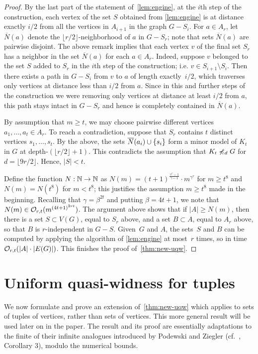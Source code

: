 \begin{proof}
By the last part of the statement of~\cref{lem:engine},  at the $i$th step of the construction, each vertex of the set $S$ obtained from \cref{lem:engine}
is at distance exactly $i/2$ from all the vertices in $A_{i+1}$ in the graph 
$G-S_i$. 
For $a\in A_r$, let $\overline{N}(a)$ denote the $\lfloor r/2\rfloor$-neighborhood of $a$ in $G-S_r$; note that sets $\overline{N}(a)$ are pairwise disjoint.
The above remark implies that each vertex $v$ of the final set $S_r$ has a neighbor in the set $\overline{N}(a)$ for each $a\in A_r$.
Indeed, suppose $v$ belonged to the set $S$ added to $S_r$ in the $i$th step of the construction; i.e. $v\in S_{i+1}\setminus S_i$.
Then there exists a path in $G-S_i$ from $v$ to $a$ of length exactly~$i/2$, which traverses only vertices at distance less than $i/2$ from $a$.
Since in this and further steps of the construction we were removing only vertices at distance at least $i/2$ from $a$, this path stays intact in $G-S_r$ and hence is completely contained in $\overline{N}(a)$.

By assumption that $m\ge t$, we may choose pairwise different vertices $a_1,\ldots,a_t\in A_r$.
To reach a contradiction, suppose that $S_r$ contains $t$ distinct vertices $s_1,\ldots,s_t$. 
By the above, the sets $\overline{N}(a_i)\cup\{s_i\}$ 
form a minor model of $K_t$ in $G$ at depth-$(\lfloor r/2\rfloor+1)$.
This contradicts the assumption that $K_t\not\preccurlyeq_d G$ for $d=\lfloor 9r/2 \rfloor$.
Hence, $|S|<t$.

Define the function  $N:\mathbb{N}\to\mathbb{N}$
as $N(m)=(t+1)^{\frac{\gamma^{r}-1}{\gamma-1}}\cdot m^{\gamma^{r}}$
for $m\ge t^8$ and $N(m)=N(t^8)$ for $m<t^8$; this justifies the assumption $m\geq t^8$ made in the beginning.
Recalling that $\gamma=\beta^{2t}$ and putting $\beta=4t+1$, we
note that $N(m)\in \mathcal{O}_{r,t}{(m^{{(4t+1)}^{2rt}})}$.
The argument above shows that if $|A|\ge N(m)$, then 
there is a set $S\subset V(G)$, equal to $S_r$ above,
and a set $B\subset A$, equal to $A_r$ above,
so that $B$ is $r$-independent in $G-S$.
Given~$G$ and $A$, the sets~$S$ and $B$ can be computed by applying the algorithm of \cref{lem:engine} at most~$r$ times, so in time $\mathcal{O}_{r,t}(|A|\cdot |E(G)|)$.
This finishes the proof of~\cref{thm:new-uqw}.
\end{proof}



\section{Uniform quasi-widness for tuples}\label{sec:uqw-tuples}
We now formulate and prove an extension of~\cref{thm:new-uqw}
which applies to sets of tuples of vertices, rather than sets of vertices. 
This more general result will be used later on in the paper. 
The result and its proof are essentially adaptations to the finite of their infinite analogues introduced by Podewski and Ziegler (cf.~\cite{podewski1978stable},  Corollary 3),
modulo the numerical bounds.

